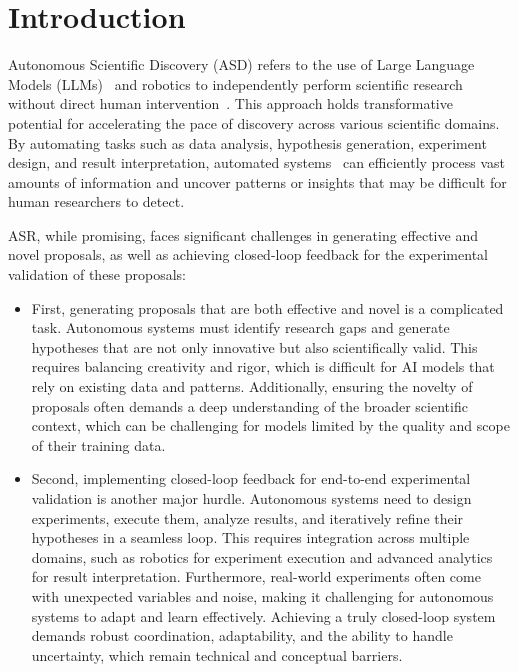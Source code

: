 \section{Introduction}
\label{sec:intro}

Autonomous Scientific Discovery (ASD) refers to the use of Large Language Models (LLMs)~\citep{yang2024qwen2-5,internvl2,qwen2vl,Deepseek-r1} and robotics to independently perform scientific research without direct human intervention~\citep{yuan2025dolphin,yan2025surveyforge,gottweis2025towards,yamada2025ai,lu2024ai}. This approach holds transformative potential for accelerating the pace of discovery across various scientific domains. By automating tasks such as data analysis, hypothesis generation, experiment design, and result interpretation, automated systems~\citep{yuan2025dolphin, lu2024ai} can efficiently process vast amounts of information and uncover patterns or insights that may be difficult for human researchers to detect.

ASR, while promising, faces significant challenges in generating effective and novel proposals, as well as achieving closed-loop feedback for the experimental validation of these proposals:

\begin{itemize}
    \item First, generating proposals that are both effective and novel is a complicated task. Autonomous systems must identify research gaps and generate hypotheses that are not only innovative but also scientifically valid. This requires balancing creativity and rigor, which is difficult for AI models that rely on existing data and patterns. Additionally, ensuring the novelty of proposals often demands a deep understanding of the broader scientific context, which can be challenging for models limited by the quality and scope of their training data.

    \item Second, implementing closed-loop feedback for end-to-end experimental validation is another major hurdle. Autonomous systems need to design experiments, execute them, analyze results, and iteratively refine their hypotheses in a seamless loop. This requires integration across multiple domains, such as robotics for experiment execution and advanced analytics for result interpretation. Furthermore, real-world experiments often come with unexpected variables and noise, making it challenging for autonomous systems to adapt and learn effectively. Achieving a truly closed-loop system demands robust coordination, adaptability, and the ability to handle uncertainty, which remain technical and conceptual barriers.

\end{itemize}

